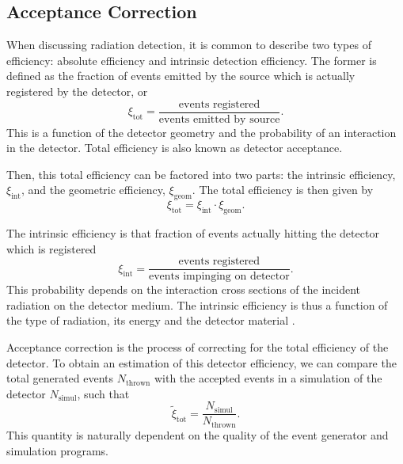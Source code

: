 \subsection{Acceptance Correction} \label{ssec::acceptance_correction}
    When discussing radiation detection, it is common to describe two types of efficiency: absolute efficiency and intrinsic detection efficiency.
    The former is defined as the fraction of events emitted by the source which is actually registered by the detector, or
    \begin{equation*}
        \xi_\text{tot} = \frac{\text{events registered}}{\text{events emitted by source}}.
    \end{equation*}
    This is a function of the detector geometry and the probability of an interaction in the detector.
    Total efficiency is also known as detector acceptance.

    Then, this total efficiency can be factored into two parts: the intrinsic efficiency, $\xi_{\text{int}}$, and the geometric efficiency, $\xi_{\text{geom}}$.
    The total efficiency is then given by
    \begin{equation*}
        \xi_\text{tot} = \xi_\text{int} \cdot \xi_\text{geom}.
    \end{equation*}

    The intrinsic efficiency is that fraction of events actually hitting the detector which is registered
    \begin{equation*}
        \xi_\text{int} = \frac{\text{events registered}}{\text{events impinging on detector}}.
    \end{equation*}
    This probability depends on the interaction cross sections of the incident radiation on the detector medium.
    The intrinsic efficiency is thus a function of the type of radiation, its energy and the detector material \cite{leo1987}.

    Acceptance correction is the process of correcting for the total efficiency of the detector.
    To obtain an estimation of this detector efficiency, we can compare the total generated events $N_\text{thrown}$ with the accepted events in a simulation of the detector $N_\text{simul}$, such that
    \begin{equation*}
        \tilde\xi_\text{tot} = \frac{N_\text{simul}}{N_\text{thrown}}.
    \end{equation*}
    This quantity is naturally dependent on the quality of the event generator and simulation programs.

